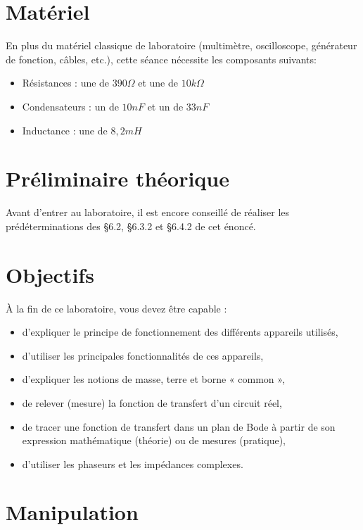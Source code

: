 \documentclass{../template/tp}
\begin{document}
\section{Matériel}
En plus du matériel classique de laboratoire (multimètre, oscilloscope, générateur de fonction, câbles, etc.), cette séance nécessite les composants suivants:
\begin{itemize}
\item Résistances : une de $390\Omega$ et une de $10k\Omega$
\item Condensateurs : un de $10nF$ et un de $33nF$
\item Inductance : une de $8,2mH$
\end{itemize}

\newpage
\section{Préliminaire théorique} %
Avant d'entrer au laboratoire, il est encore conseillé de réaliser les prédéterminations des §6.2, §6.3.2 et §6.4.2 de cet énoncé.

\section{Objectifs}
À la fin de ce laboratoire, vous devez être capable :
\begin{itemize}
\item d'expliquer le principe de fonctionnement des différents appareils utilisés,
\item d'utiliser les principales fonctionnalités de ces appareils,
\item d'expliquer les notions de masse, terre et borne « common »,
\item de relever (mesure) la fonction de transfert d'un circuit réel,
\item de tracer une fonction de transfert dans un plan de Bode à partir de son expression mathématique (théorie) ou de
mesures (pratique),
\item d'utiliser les phaseurs et les impédances complexes.
\end{itemize}



\section{Manipulation}
\end{document}
